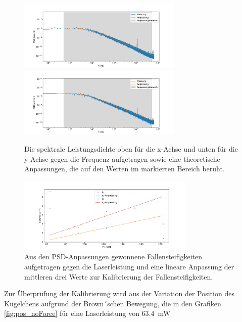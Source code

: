             \begin{figure}[h]
            \centering
            \includegraphics[width = 0.7\textwidth]{freq_x.pdf}
            \includegraphics[width = 0.7\textwidth]{freq_y.pdf}
            \caption{Die spektrale Leistungsdichte oben für die x-Achse und unten für die y-Achse gegen die Frequenz aufgetragen sowie eine theoretische Anpassungen, die auf den Werten im markierten Bereich beruht.}
            \label{fig:freq_noForce}
            \end{figure}
            \FloatBarrier
            \begin{figure}[h]
            \centering
            \includegraphics[width = 0.75\textwidth]{k_noForce.pdf}
            \caption{Aus den PSD-Anpassungen gewonnene Fallensteifigkeiten aufgetragen gegen die Laserleistung und eine lineare Anpassung der mittleren drei Werte zur Kalibrierung der Fallensteifigkeiten.}
            \label{fig:k_noForce}
            \end{figure}
            \FloatBarrier
            Zur Überprüfung der Kalibrierung wird aus der Variation der Position des Kügelchens aufgrund der Brown´schen Bewegung, die in den Grafiken \ref{fig:pos_noForce} für eine Laserleistung von 
            \SI{63.4}{\milli\watt}
